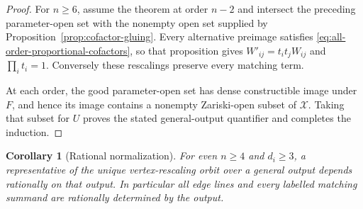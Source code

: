 \documentclass[11pt]{article}
\newtheorem{corollary}[theorem]{Corollary}
\theoremstyle{remark}\newtheorem{remark}[theorem]{Remark}
\newcommand{\cX}{\mathcal X}
\begin{document}
\begin{proof}
For $n\geq6$, assume the theorem at order $n-2$ and intersect the
preceding parameter-open set with the nonempty open set supplied by
Proposition~\ref{prop:cofactor-gluing}. Every alternative preimage
satisfies \eqref{eq:all-order-proportional-cofactors}, so that
proposition gives $W'_{ij}=t_it_jW_{ij}$ and $\prod_i t_i=1$.
Conversely these rescalings preserve every matching term.

At each order, the good parameter-open set has dense constructible
image under $F$, and hence its image contains a nonempty Zariski-open
subset of $\cX$. Taking that subset for $U$ proves the stated
general-output quantifier and completes the induction.
\end{proof}

\begin{corollary}[Rational normalization]\label{cor:rational-all-order}
For even $n\geq4$ and $d_i\geq3$, a representative of the unique
vertex-rescaling orbit over a general output depends rationally on
that output. In particular all edge lines and every labelled matching
summand are rationally determined by the output.
\end{corollary}
\end{document}
